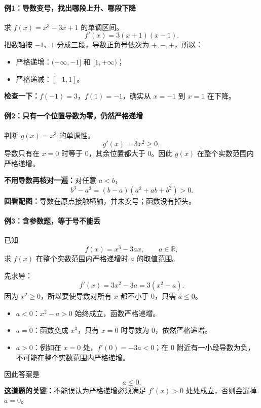 \begin{examplebox}
\paragraph{例1：导数变号，找出哪段上升、哪段下降}
求 $f(x)=x^3-3x+1$ 的单调区间。
\[
f'(x)=3(x+1)(x-1).
\]
把数轴按 $-1$、$1$ 分成三段，导数正负号依次为 $+,-,+$，所以：
\begin{itemize}
  \item 严格递增：$(-\infty,-1]$ 和 $[1,+\infty)$；
  \item 严格递减：$[-1,1]$。
\end{itemize}

\textbf{检查一下：}$f(-1)=3$，$f(1)=-1$，确实从 $x=-1$ 到 $x=1$ 在下降。

\par\medskip
\noindent\begin{minipage}{\linewidth}
\paragraph{例2：只有一个位置导数为零，仍然严格递增}
\begin{center}\end{center}
\end{minipage}\par\medskip
判断 $g(x)=x^3$ 的单调性。
\[
g'(x)=3x^2\ge0,
\]
导数只有在 $x=0$ 时等于 $0$，其余位置都大于 $0$。因此 $g(x)$ 在整个实数范围内严格递增。

\textbf{不用导数再核对一遍：}对任意 $a<b$，
\[
b^3-a^3=(b-a)(a^2+ab+b^2)>0.
\]
\textbf{回看配图：}导数在原点接触横轴，并未变号；函数没有掉头。

\paragraph{例3：含参数题，等于号不能丢}
已知
\[
f(x)=x^3-3ax,\qquad a\in\mathbb R,
\]
求 $f(x)$ 在整个实数范围内严格递增时 $a$ 的取值范围。

先求导：
\[
f'(x)=3x^2-3a=3(x^2-a).
\]
因为 $x^2\ge0$，所以要使导数对所有 $x$ 都不小于 $0$，只需 $a\le0$。

\begin{itemize}
  \item $a<0$：$x^2-a>0$ 始终成立，函数严格递增。
  \item $a=0$：函数变成 $x^3$，只有 $x=0$ 时导数为 $0$，依然严格递增。
  \item $a>0$：例如在 $x=0$ 处，$f'(0)=-3a<0$；在 $0$ 附近有一小段导数为负，不可能在整个实数范围内严格递增。
\end{itemize}
因此答案是
\[
\boxed{a\le0}.
\]
\textbf{这道题的关键：}不能误认为严格递增必须满足 $f'(x)>0$ 处处成立，否则会漏掉 $a=0$。


\end{examplebox}
